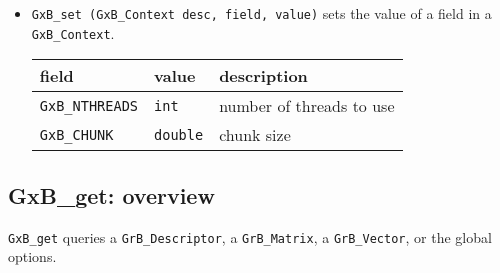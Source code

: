 \documentclass[12pt]{article}
\begin{document}
\begin{itemize}
\item \verb'GxB_set (GxB_Context desc, field, value)' sets
    the value of a field in a \verb'GxB_Context'.

{\footnotesize
\begin{tabular}{lll}
field                       & value         & description \\
\hline
\verb'GxB_NTHREADS'         & \verb'int'    & number of threads to use \\
\verb'GxB_CHUNK'            & \verb'double' & chunk size \\
\hline
\end{tabular}
}

\end{itemize}

\subsection{{\sf GxB\_get}: overview}

\verb'GxB_get' queries a \verb'GrB_Descriptor', a \verb'GrB_Matrix',
a \verb'GrB_Vector', or the global options.
\end{document}
